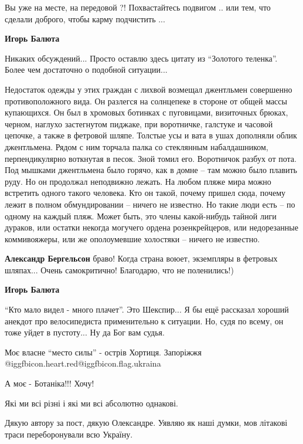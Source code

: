 \begin{itemize}
\begin{itemize}
Вы уже на месте, на передовой ?! Похвастайтесь подвигом .. или тем, что сделали
доброго, чтобы карму подчистить ...

\textbf{Игорь Балюта} 

Никаких обсуждений... Просто оставлю здесь цитату из \enquote{Золотого теленка}. Более
чем достаточно о подобной ситуации...

Недостаток одежды у этих граждан с лихвой возмещал джентльмен совершенно
противоположного вида. Он разлегся на солнцепеке в стороне от общей массы
купающихся. Он был в хромовых ботинках с пуговицами, визиточных брюках, черном,
наглухо застегнутом пиджаке, при воротничке, галстуке и часовой цепочке, а
также в фетровой шляпе. Толстые усы и вата в ушах дополняли облик джентльмена.
Рядом с ним торчала палка со стеклянным набалдашником, перпендикулярно
воткнутая в песок. Зной томил его. Воротничок разбух от пота. Под мышками
джентльмена было горячо, как в домне – там можно было плавить руду. Но он
продолжал неподвижно лежать. На любом пляже мира можно встретить одного такого
человека. Кто он такой, почему пришел сюда, почему лежит в полном
обмундировании – ничего не известно. Но такие люди есть – по одному на каждый
пляж. Может быть, это члены какой-нибудь тайной лиги дураков, или остатки
некогда могучего ордена розенкрейцеров, или недорезанные коммивояжеры, или же
ополоумевшие холостяки – ничего не известно.

\textbf{Александр Бергельсон} браво! Когда страна воюет, экземпляры в фетровых шляпах... Очень самокритично! Благодарю, что не поленились!)

\textbf{Игорь Балюта} 

\enquote{Кто мало видел - много плачет}. Это Шекспир... Я бы ещё рассказал хороший
анекдот про велосипедиста применительно к ситуации. Но, судя по всему, он тоже
уйдет в пустоту... Ну да Бог вам судья.

\end{itemize} %

Моє власне \enquote{место силы} - острів Хортиця. Запоріжжя @igg{fbicon.heart.red}@igg{fbicon.flag.ukraina}

А моє - Ботаніка!!! Хочу!


Які ми всі різні і які ми всі абсолютно однакові.

Дякую автору за пост, дякую Олександре. Уявляю як наші думки, мов літакові
траси переборонували всю Україну.


\end{itemize}
